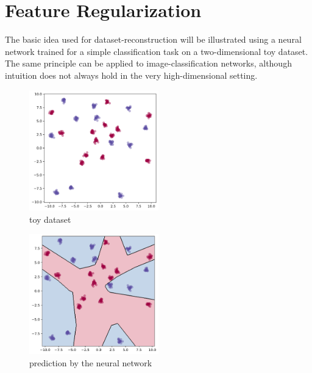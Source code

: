 
\chapter{Feature Regularization} %

\label{Chapter2} %


The basic idea used for dataset-reconstruction will be illustrated using a neural network trained for a simple classification task on a two-dimensional toy dataset. The same principle can be applied to image-classification networks, although intuition does not always hold in the very high-dimensional setting.

\begin{figure}
\centering
\includegraphics[width=0.5\textwidth]{Figures/toy_dataset.png}
\decoRule
\caption{toy dataset}
\label{fig:toy_dataset}
\end{figure}


\begin{figure}
\centering
\includegraphics[width=0.5\textwidth]{Figures/toy_dataset_contour.png}
\decoRule
\caption{prediction by the neural network}
\label{fig:toy_dataset_contour}
\end{figure}

